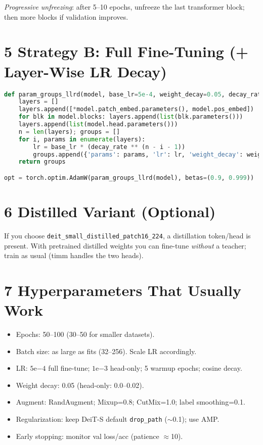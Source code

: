 \documentclass[11pt]{article}
\begin{document}
\noindent\textit{Progressive unfreezing}: after 5--10 epochs, unfreeze the last transformer block; then more blocks if validation improves.

\section*{5 Strategy B: Full Fine-Tuning (+ Layer-Wise LR Decay)}
\begin{lstlisting}[language=python,style=code]
def param_groups_llrd(model, base_lr=5e-4, weight_decay=0.05, decay_rate=0.75):
    layers = []
    layers.append([*model.patch_embed.parameters(), model.pos_embed])  # shallowest
    for blk in model.blocks: layers.append(list(blk.parameters()))
    layers.append(list(model.head.parameters()))                       # head
    n = len(layers); groups = []
    for i, params in enumerate(layers):
        lr = base_lr * (decay_rate ** (n - i - 1))
        groups.append({'params': params, 'lr': lr, 'weight_decay': weight_decay})
    return groups

opt = torch.optim.AdamW(param_groups_llrd(model), betas=(0.9, 0.999))
\end{lstlisting}

\section*{6 Distilled Variant (Optional)}
If you choose \texttt{deit\_small\_distilled\_patch16\_224}, a distillation token/head is present. With pretrained distilled weights you can fine-tune \emph{without} a teacher; train as usual (timm handles the two heads).

\section*{7 Hyperparameters That Usually Work}
\begin{itemize}[leftmargin=1.3em]
  \item Epochs: 50--100 (30--50 for smaller datasets).
  \item Batch size: as large as fits (32--256). Scale LR accordingly.
  \item LR: $5\mathrm{e}{-4}$ full fine-tune; $1\mathrm{e}{-3}$ head-only; 5 warmup epochs; cosine decay.
  \item Weight decay: 0.05 (head-only: 0.0--0.02).
  \item Augment: RandAugment; Mixup=0.8; CutMix=1.0; label smoothing=0.1.
  \item Regularization: keep DeiT-S default \texttt{drop\_path} ($\sim$0.1); use AMP.
  \item Early stopping: monitor val loss/acc (patience $\approx$10).
\end{itemize}
\end{document}
